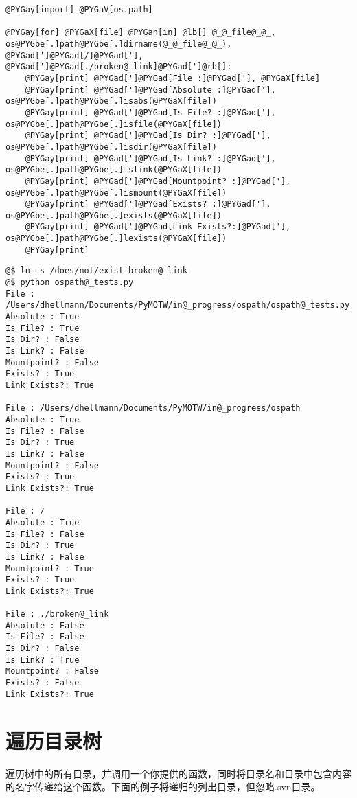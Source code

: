 \documentclass[a4paper,10pt,english]{manual}
\begin{document}
\begin{Verbatim}[commandchars=@\[\]]
@PYGay[import] @PYGaV[os.path]

@PYGay[for] @PYGaX[file] @PYGan[in] @lb[] @_@_file@_@_, os@PYGbe[.]path@PYGbe[.]dirname(@_@_file@_@_), @PYGad[']@PYGad[/]@PYGad['], @PYGad[']@PYGad[./broken@_link]@PYGad[']@rb[]:
    @PYGay[print] @PYGad[']@PYGad[File :]@PYGad['], @PYGaX[file]
    @PYGay[print] @PYGad[']@PYGad[Absolute :]@PYGad['], os@PYGbe[.]path@PYGbe[.]isabs(@PYGaX[file])
    @PYGay[print] @PYGad[']@PYGad[Is File? :]@PYGad['], os@PYGbe[.]path@PYGbe[.]isfile(@PYGaX[file])
    @PYGay[print] @PYGad[']@PYGad[Is Dir? :]@PYGad['], os@PYGbe[.]path@PYGbe[.]isdir(@PYGaX[file])
    @PYGay[print] @PYGad[']@PYGad[Is Link? :]@PYGad['], os@PYGbe[.]path@PYGbe[.]islink(@PYGaX[file])
    @PYGay[print] @PYGad[']@PYGad[Mountpoint? :]@PYGad['], os@PYGbe[.]path@PYGbe[.]ismount(@PYGaX[file])
    @PYGay[print] @PYGad[']@PYGad[Exists? :]@PYGad['], os@PYGbe[.]path@PYGbe[.]exists(@PYGaX[file])
    @PYGay[print] @PYGad[']@PYGad[Link Exists?:]@PYGad['], os@PYGbe[.]path@PYGbe[.]lexists(@PYGaX[file])
    @PYGay[print]
\end{Verbatim}

\begin{Verbatim}[commandchars=@\[\]]
@$ ln -s /does/not/exist broken@_link
@$ python ospath@_tests.py
File : /Users/dhellmann/Documents/PyMOTW/in@_progress/ospath/ospath@_tests.py
Absolute : True
Is File? : True
Is Dir? : False
Is Link? : False
Mountpoint? : False
Exists? : True
Link Exists?: True

File : /Users/dhellmann/Documents/PyMOTW/in@_progress/ospath
Absolute : True
Is File? : False
Is Dir? : True
Is Link? : False
Mountpoint? : False
Exists? : True
Link Exists?: True

File : /
Absolute : True
Is File? : False
Is Dir? : True
Is Link? : False
Mountpoint? : True
Exists? : True
Link Exists?: True

File : ./broken@_link
Absolute : False
Is File? : False
Is Dir? : False
Is Link? : True
Mountpoint? : False
Exists? : False
Link Exists?: True
\end{Verbatim}


\section{遍历目录树}

 遍历树中的所有目录，并调用一个你提供的函数，同时将目录名和目录中包含内容的名字传递给这个函数。下面的例子将递归的列出目录，但忽略.svn目录。
\end{document}
